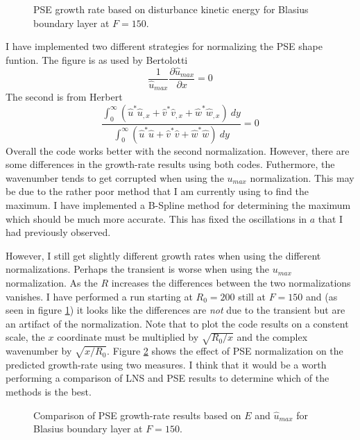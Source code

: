 \documentclass[12pt]{article}
\begin{document}
\begin{figure}
\centering \epsfxsize=4.5in 
\setvlabel{$-\gamma$}
\caption {PSE growth rate based on disturbance kinetic energy for Blasius
boundary layer at $F=150$. \label{f:f150}}
\end{figure}

I have implemented two different strategies for normalizing the PSE shape
funtion.  The figure is as used by Bertolotti
%
\begin{equation}
  \frac{1}{\hat u_{max}}\frac{\partial \hat u_{max}}{\partial x} = 0
\end{equation}
%
The second is from Herbert
%
\begin{equation}
  \frac{ \int_0^\infty \left( \hat u^* \hat u_{,x} + \hat v^* \hat v_{,x} + 
         \hat w^* \hat w_{,x} \right) \ dy }
       { \int_0^\infty \left( \hat u^* \hat u + \hat v^* \hat v + 
         \hat w^* \hat w \right) \ dy} = 0
\end{equation}
%
Overall the code works better with the second normalization.  However, there
are some differences in the growth-rate results using both codes.  Futhermore,
the wavenumber tends to get corrupted when using the $u_{max}$ normalization.
This may be due to the rather poor method that I am currently using to find
the maximum.  I have implemented a B-Spline method for determining the maximum
which should be much more accurate.  This has fixed the oscillations in $a$
that I had previously observed.

However, I still get slightly different growth rates when using the different
normalizations.  Perhaps the transient is worse when using the $u_{max}$
normalization.  As the $R$ increases the differences between the two
normalizations vanishes.  I have performed a run starting at $R_0=200$ still
at $F=150$ and (as seen in figure \ref{f:f150}) it looks like the differences
are {\em not} due to the transient but are an artifact of the normalization.
Note that to plot the code results on a constent scale, the $x$ coordinate
must be multiplied by $\sqrt{R_0/x}$ and the complex wavenumber by
$\sqrt{x/R_0}$.  Figure \ref{f:gamma} shows the effect of PSE normalization on
the predicted growth-rate using two measures.  I think that it would be a
worth performing a comparison of LNS and PSE results to determine which of the
methods is the best.

\begin{figure}
\centering \epsfxsize=4.5in 
\setvlabel{$\gamma$}
\caption {Comparison of PSE growth-rate results based on $E$ and $\hat
u_{max}$ for Blasius boundary layer at $F=150$. \label{f:gamma}}
\end{figure}
\end{document}
